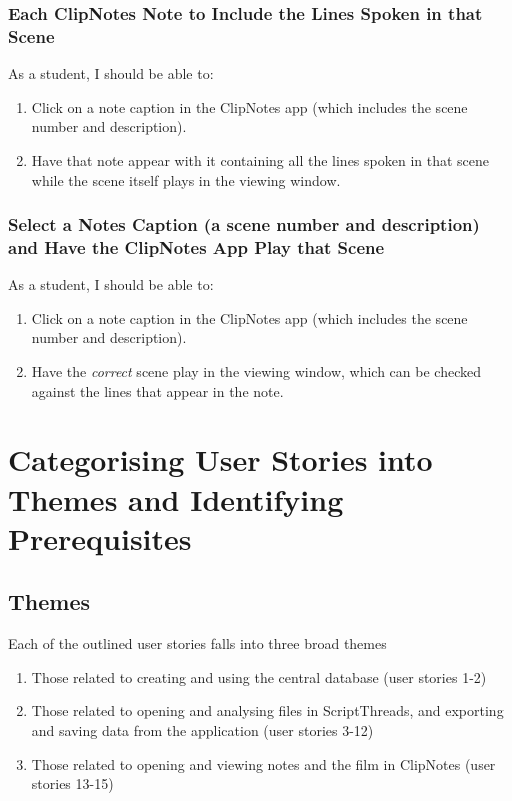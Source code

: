 \documentclass{article}
\begin{document}
\subsubsection{Each ClipNotes Note to Include the Lines Spoken in that Scene}
As a student, I should be able to:
\begin{enumerate}
    \item Click on a note caption in the ClipNotes app (which includes the scene number and description).
    \item Have that note appear with it containing all the lines spoken in that scene while the scene itself plays in the viewing window.
\end{enumerate}

\subsubsection{Select a Notes Caption (a scene number and description) and Have the ClipNotes App Play that Scene}
As a student, I should be able to:
\begin{enumerate}
    \item Click on a note caption in the ClipNotes app (which includes the scene number and description).
    \item Have the \textit{correct} scene play in the viewing window, which can be checked against the lines that appear in the note.
\end{enumerate}

\section{Categorising User Stories into Themes and Identifying Prerequisites}

\subsection{Themes}
Each of the outlined user stories falls into three broad themes
\begin{enumerate}
    \item Those related to creating and using the central database (user stories 1-2)
    \item Those related to opening and analysing files in ScriptThreads, and exporting and saving data from the application (user stories 3-12)
    \item Those related to opening and viewing notes and the film in ClipNotes (user stories 13-15)
\end{enumerate}
\end{document}
